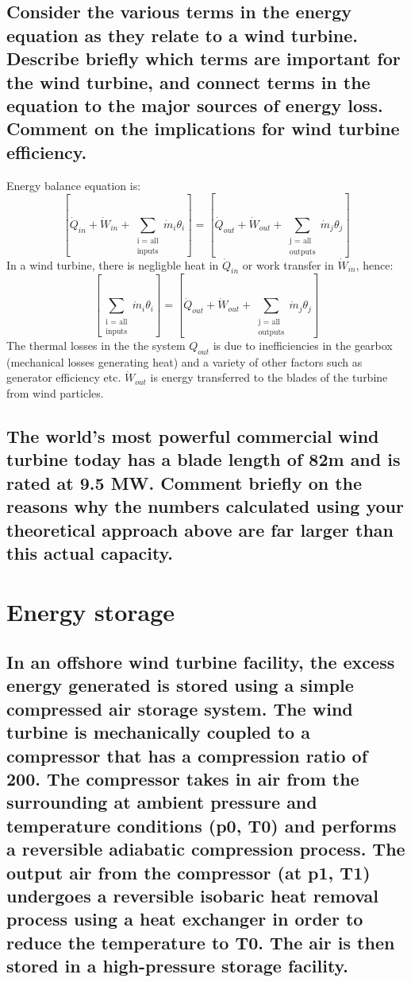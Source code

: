 \documentclass[12pt]{article}
\numberwithin{equation}{section}
\begin{document}
\begin{flushleft}
\subsection{Consider the various terms in the energy equation as they relate to a wind turbine. Describe briefly which terms are important for the wind turbine, and connect terms in the equation to the major sources of energy loss. Comment on the implications for wind turbine efficiency.}
Energy balance equation is:
\begin{equation}
  \left[ \dot{Q}_{in} + \dot{W}_{in} + \sum_{\substack{\text{i = all} \\ \text{inputs}}} \dot{m}_i \theta_i \right] = \left[ \dot{Q}_{out} + \dot{W}_{out} + \sum_{\substack{\text{j = all} \\ \text{outputs}}} \dot{m}_j \theta_j \right]
\end{equation}
In a wind turbine, there is negligble heat in $\dot{Q}_{in}$ or work transfer in $\dot{W}_{in}$, hence:
\begin{equation}
  \left[\sum_{\substack{\text{i = all} \\ \text{inputs}}} \dot{m}_i \theta_i \right] = \left[ \dot{Q}_{out} + \dot{W}_{out} + \sum_{\substack{\text{j = all} \\ \text{outputs}}} \dot{m}_j \theta_j \right]
\end{equation}
The thermal losses in the the system $\si{Q}_{out}$ is due to inefficiencies in the gearbox (mechanical losses generating heat) and a variety of other factors such as generator efficiency etc. $\dot{W}_{out}$ is energy transferred to the blades of the turbine from wind particles. 
\subsection{The world’s most powerful commercial wind turbine today has a blade length of 82m and is rated at 9.5 MW. Comment briefly on the reasons why the numbers calculated using your theoretical approach above are far larger than this actual capacity.}

\section{Energy storage}
\subsection{In an offshore wind turbine facility, the excess energy generated is stored using a simple compressed air storage system. The wind turbine is mechanically coupled to a compressor that has a compression ratio of 200. The compressor takes in air from the surrounding at ambient pressure and temperature conditions (p0, T0) and performs a reversible adiabatic compression process. The output air from the compressor (at p1, T1) undergoes a reversible isobaric heat removal process using a heat exchanger in order to reduce the temperature to T0. The air is then stored in a high-pressure storage facility.}

\end{flushleft}
\end{document}
